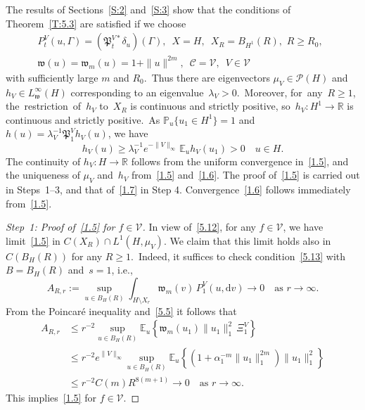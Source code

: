 \documentclass[AHL,Unicode,longabstracts]{cedram}
\newcommand{\R}{{\mathbb R}}
\newcommand{\pP}{{\mathbb P}}
\newcommand{\E}{{\mathbb E}}
\newcommand{\CC}{{\mathcal C}}
\newcommand{\PP}{{\mathcal P}}
\newcommand{\VV}{{\mathcal V}}
\newcommand{\la}{\lambda}
\newcommand{\ty}{\infty}
\newcommand{\wwww}{{\mathfrak w}}
\newcommand{\PPPP}{{\mathfrak P}}
\newcommand{\dd}{\mathrm{d}}
\newenvironment{step}{\begin{proof}}{\let\qed\relax \end{proof}}
\begin{document}
The results of Sections~\ref{S:2} and~\ref{S:3} show that the conditions of Theorem~\ref{T:5.3} are satisfied if we choose
\begin{gather*}
P_t^V(u,\Gamma)=(\PPPP_t^{V*} \delta_u) (\Gamma),\,\,\,X=H, \,\,\, X_R= B_{H^1}(R), \,\, R\ge R_0, \,\,\, \\
\wwww(u)=\wwww_m(u)=1+\|u\|^{2m},\,\,\, \CC= \VV, \,\,\, V\in \VV
\end{gather*}
with sufficiently large $m$ and $R_0$.~Thus there are eigenvectors $\mu_V\in \PP(H)$ and $h_V\in L_\wwww^\infty(H)$ corresponding to an eigenvalue~$\lambda_V>0$.~Moreover, for~any~$R\ge1$, the~restriction~of~$h_V$ to~$X_R$ is continuous and strictly positive, so~$h_V: H^1\to \R$ is continuous and strictly positive.~As $\pP_u\{u_1\in H^1\}=1$ and $h(u)=\la_V^{-1}\PPPP_1^Vh_V(u)$, we have
\[
h_V(u)\ge\lambda_V^{-1}e^{- \|V\|_\infty}\,\E_u h_V(u_{1})>0 \quad u\in H.
\]
The continuity of $h_V:H\to \R $ follows from the uniform convergence in~\eqref{1.5}, and the uniqueness of $\mu_V$ and~$h_V$ from~\eqref{1.5} and~\eqref{1.6}. The proof of~\eqref{1.5} is carried out in Steps~1--3, and that of~\eqref{1.7} in Step 4. Convergence~\eqref{1.6} follows immediately from~\eqref{1.5}.

\begin{step}[Step~1: Proof of~\eqref{1.5} for $f\in \VV$]
In view of~\eqref{5.12}, for any $f\in \VV$, we have limit~\eqref{1.5} in $C(X_R)\cap L^1(H,\mu_V)$. We claim that this limit holds also in~$C(B_H(R))$ for any $R\ge1$.~Indeed, it suffices to check condition~\eqref{5.13} with~$B=B_H(R)$ and~$s=1$, i.e.,
\[
A_{R,r}:= \sup_{u\in B_H(R)} \int_{H\setminus X_r}\wwww_m(v)\,P^V_1(u,\dd v) \to0
\quad\mbox{as $r\to\infty$}.
\]
From the Poincar\'e inequality and~\eqref{5.5} it follows that
\begin{align*}
A_{R,r}&\le r^{-2}\sup_{u\in B_H(R)} \E_u\left\{\wwww_m(u_1)\|u_1\|_1^2 \,\Xi_1^V \right\}\\&\le r^{-2}e^{\|V\|_\ty}\sup_{u\in B_H(R)} \E_u\left\{(1+\alpha_1^{-m}\|u_1\|_1^{2m})\|u_1\|_1^2 \right\} \\&\le r^{-2} C(m) R^{8(m+1)}\to 0\quad\text{as $r\to\ty$}.
\end{align*}
This implies~\eqref{1.5} for $f\in \VV$.
\end{step}
\end{document}
